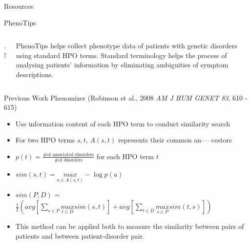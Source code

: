 \documentclass[final]{beamer} %
\begin{document}
\begin{frame}{}
\begin{columns}[T]
\begin{column}{0.3\linewidth}
\begin{block}{\Huge Resources}
  

   \begin{block}{\Large PhenoTips}
      \begin{columns}[T]
        \begin{column} {.5\textwidth}
           \vspace{2.5cm}
           \centering
        \end{column}
        
        \begin{column}{.5\textwidth}
          \Large
          PhenoTips helps collect phenotype data of patients with genetic disorders using standard HPO terms. Standard terminology helps the process of analysing patients' information by eliminating ambiguities of symptom descriptions.
        \end{column}
      \end{columns}
    \end{block}

   \end{block}

   \begin{block}{\Large Previous Work}
   \Large
   Phenomizer (Robinson et al., 2008 {\it{\Large AM J HUM GENET 83}}, 610 - 615)
   \begin{itemize}
    \item
    Use information content of each HPO term to conduct similarity search
    \item
    For two HPO terms $s, t$, $A(s, t)$ represents their common an-----cestors
    \item
    $p(t) = \frac{\text{\# of associated disorders}}{\text{\# of disorders}}$ for each HPO term $t$
    \item
    $sim(s, t) = \underset{a \in A(s, t)}{max} -\log p(a)$
    \item
    $sim(P,  D)$ = $\frac{1}{2} ( avg[\sum\limits_{s \in P}
    \underset{t \in D}{max} sim(s, t) ]  +  avg[\sum\limits_{t \in D}
    \underset{s \in P}{max} sim(t, s) ]  ) $ 
    \item
    This method can be applied both to measure the similarity between pairs of patients and between patient-disorder pair.
  \end{itemize}
   \end{block}
    \end{column}


\end{columns}
\end{frame}
\end{document}
